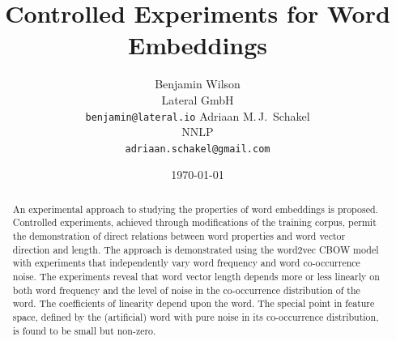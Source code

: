 \documentclass{article} %
\title{Controlled Experiments for Word Embeddings}
\author{
 	Benjamin Wilson\\
	Lateral GmbH\\
	\texttt{benjamin@lateral.io}
	\And
	Adriaan M.\,J.\, Schakel\\
	NNLP\\
	\texttt{adriaan.schakel@gmail.com}
 }
\date{\today}
\begin{document}
\graphicspath{{../outputs/}}
\maketitle

\begin{abstract}
	An experimental approach to studying the properties of word
        embeddings is proposed.  Controlled experiments, achieved
        through modifications of the training corpus, permit the
        demonstration of direct relations between word properties and
        word vector direction and length.  The approach is demonstrated
        using the word2vec CBOW model with experiments that
        independently vary word frequency and word co-occurrence noise.
        The experiments reveal that word vector length depends more or
        less linearly on both word frequency and the level of noise in
        the co-occurrence distribution of the word.  The coefficients of
        linearity depend upon the word.  The special point in feature
        space, defined by the (artificial) word with pure noise in its
        co-occurrence distribution, is found to be small but non-zero.
\end{abstract} 
\end{document}
